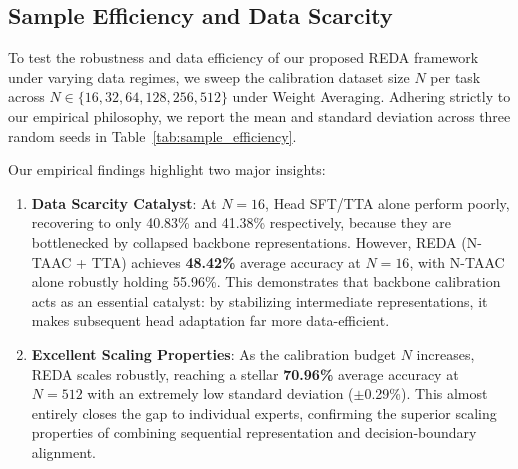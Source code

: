 \documentclass{article}
\theoremstyle{plain}
\theoremstyle{definition}
\theoremstyle{remark}
\begin{document}
\subsection{Sample Efficiency and Data Scarcity}

To test the robustness and data efficiency of our proposed REDA framework under varying data regimes, we sweep the calibration dataset size $N$ per task across $N \in \{16, 32, 64, 128, 256, 512\}$ under Weight Averaging. Adhering strictly to our empirical philosophy, we report the mean and standard deviation across three random seeds in Table~\ref{tab:sample_efficiency}.

Our empirical findings highlight two major insights:
\begin{enumerate}
    \item \textbf{Data Scarcity Catalyst}: At $N=16$, Head SFT/TTA alone perform poorly, recovering to only 40.83\% and 41.38\% respectively, because they are bottlenecked by collapsed backbone representations. However, REDA (N-TAAC + TTA) achieves \textbf{48.42\%} average accuracy at $N=16$, with N-TAAC alone robustly holding 55.96\%. This demonstrates that backbone calibration acts as an essential catalyst: by stabilizing intermediate representations, it makes subsequent head adaptation far more data-efficient.
    \item \textbf{Excellent Scaling Properties}: As the calibration budget $N$ increases, REDA scales robustly, reaching a stellar \textbf{70.96\%} average accuracy at $N=512$ with an extremely low standard deviation ($\pm$0.29\%). This almost entirely closes the gap to individual experts, confirming the superior scaling properties of combining sequential representation and decision-boundary alignment.
\end{enumerate}
\end{document}
